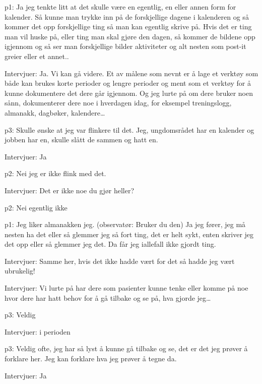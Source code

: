 \documentclass[11pt,UKenglish, a4paper]{article}
\begin{document}
\textcolor{myGreen} {p1:} Ja jeg tenkte litt at det skulle være en egentlig, en eller annen form for kalender. Så kunne man trykke inn på de forskjellige dagene i kalenderen og så kommer det opp forskjellige ting så man kan egentlig skrive på. Hvis det er ting man vil huske på, eller ting man skal gjøre den dagen, så kommer de bildene opp igjennom og så ser man forskjellige bilder aktiviteter og alt nesten som post-it greier eller et annet..

\textcolor{myBlue} {Intervjuer:} Ja. Vi kan gå videre. Et av målene som nevnt er å lage et verktøy som både kan brukes korte perioder og lengre perioder og ment som et verktøy for å kunne dokumentere det dere går igjennom. Og jeg lurte på om dere bruker noen sånn, dokumenterer dere noe i hverdagen idag, for eksempel treningslogg, almanakk, dagbøker, kalendere\dots

\textcolor{myR} {p3:} Skulle ønske at jeg var flinkere til det. Jeg, ungdomsrådet har en kalender og jobben har en, skulle slått de sammen og hatt en.

\textcolor{myBlue} {Intervjuer:} Ja

\textcolor{myYellow} {p2:} Nei jeg er ikke flink med det.

\textcolor{myBlue} {Intervjuer:} Det er ikke noe du gjør heller?

\textcolor{myYellow} {p2:} Nei egentlig ikke

\textcolor{myGreen} {p1:} Jeg liker almanakken jeg. (observatør: Bruker du den) Ja jeg fører, jeg må nesten ha det eller så glemmer jeg så fort ting, det er helt sykt, enten skriver jeg det opp eller så glemmer jeg det. Da får jeg iallefall ikke gjordt ting.

\textcolor{myBlue} {Intervjuer:} Samme her, hvis det ikke hadde vært for det så hadde jeg vært ubrukelig!

\textcolor{myBlue} {Intervjuer:} Vi lurte på har dere som pasienter kunne tenke eller komme på noe hvor dere har hatt behov for å gå tilbake og se på, hva gjorde jeg\dots

\textcolor{myR} {p3:} Veldig

\textcolor{myBlue} {Intervjuer:} i perioden

\textcolor{myR} {p3:} Veldig ofte, jeg har så lyst å kunne gå tilbake og se, det er det jeg prøver å forklare her. Jeg kan forklare hva jeg prøver å tegne da.

\textcolor{myBlue} {Intervjuer:} Ja
\end{document}
